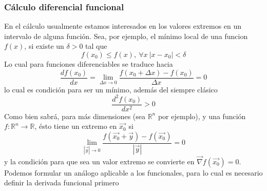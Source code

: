 \documentclass[12pt]{report}
\begin{document}
\subsubsection{Cálculo diferencial funcional}
En el cálculo usualmente estamos interesados en los valores extremos en un intervalo de alguna función. Sea, por ejemplo, el mínimo local de una funcion $f(x)$, si existe un $\delta >0$ tal que
\begin{equation}
f(x_0)\leq f(x),\ \forall x\ |x-x_0|<\delta
\end{equation}
Lo cual para funciones diferenciables se traduce hacia
\begin{equation}
\frac{df(x_0)}{dx}=\lim_{\Delta x\rightarrow 0} \frac{f(x_0+\Delta x)-f(x_0)}{\Delta x}=0
\end{equation}
lo cual es condición para ser un mínimo, además del siempre clásico
\begin{equation}
\frac{d^2f(x_0)}{dx^2}>0
\end{equation}
Como bien sabrá, para más dimensiones (sea $\mathbb{R}^n$ por ejemplo), y una función $f: \mathbb{R}^n\rightarrow\mathbb{R}$, ésto tiene un extremo en $\vec{x_0}$ si
\begin{equation}
\lim_{|\vec{y}|\rightarrow 0}\frac{f(\vec{x_0}+\vec{y})-f(\vec{x_0})}{|\vec{y}|}=0
\end{equation}
y la condición para que sea un valor extremo se convierte en $\vec{\nabla}f(\vec{x_0})=0$.\\
Podemos formular un análogo aplicable a los funcionales, para lo cual es necesario definir la derivada funcional primero
\end{document}
